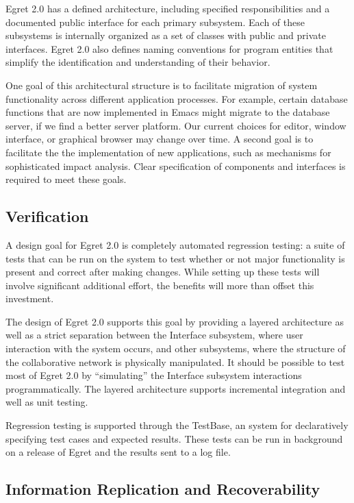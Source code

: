 Egret 2.0 has a defined architecture, including specified
responsibilities and a documented public interface for each primary
subsystem.  Each of these subsystems is internally organized as a set
of classes with public and private interfaces.  Egret 2.0 also defines
naming conventions for program entities that simplify the
identification and understanding of their behavior.

One goal of this architectural structure is to facilitate migration of
system functionality across different application processes.  For
example, certain database functions that are now implemented in Emacs
might migrate to the database server, if we find a better server
platform.  Our current choices for editor, window interface, or
graphical browser may change over time.  A second goal is to
facilitate the the implementation of new applications, such as
mechanisms for sophisticated impact analysis.  Clear specification of
components and interfaces is required to meet these goals.

\subsection{Verification} 

A design goal for Egret 2.0 is completely automated regression
testing: a suite of tests that can be run on the system to test
whether or not major functionality is present and correct after making
changes.  While setting up these tests will involve significant
additional effort, the benefits will more than offset this investment.

The design of Egret 2.0 supports this goal by providing a layered
architecture as well as a strict separation between the Interface
subsystem, where user interaction with the system occurs, and other
subsystems, where the structure of the collaborative network is
physically manipulated.  It should be possible to test most of Egret
2.0 by ``simulating'' the Interface subsystem interactions
programmatically.  The layered architecture supports incremental
integration and well as unit testing.

Regression testing is supported through the TestBase, an system for
declaratively specifying test cases and expected results.  These tests
can be run in background on a release of Egret and the results sent to
a log file.

\subsection{Information Replication and Recoverability}

